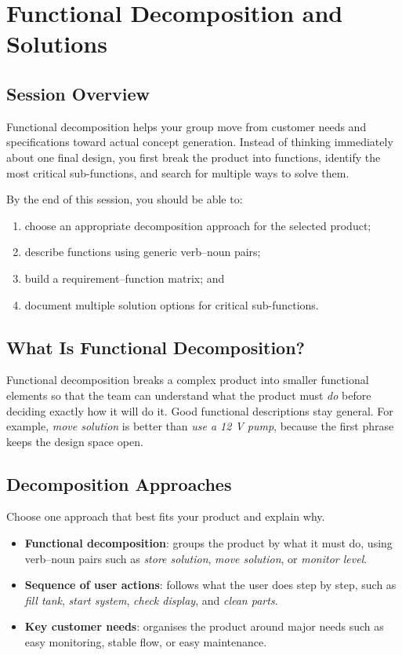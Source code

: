 \chapter{Functional Decomposition and Solutions}

\section{Session Overview}

Functional decomposition helps your group move from customer needs and specifications toward actual concept generation. Instead of thinking immediately about one final design, you first break the product into functions, identify the most critical sub-functions, and search for multiple ways to solve them.

By the end of this session, you should be able to:
\begin{enumerate}
    \item choose an appropriate decomposition approach for the selected product;
    \item describe functions using generic verb--noun pairs;
    \item build a requirement--function matrix; and
    \item document multiple solution options for critical sub-functions.
\end{enumerate}

\section{What Is Functional Decomposition?}

Functional decomposition breaks a complex product into smaller functional elements so that the team can understand what the product must \emph{do} before deciding exactly how it will do it. Good functional descriptions stay general. For example, \textit{move solution} is better than \textit{use a 12 V pump}, because the first phrase keeps the design space open.

\section{Decomposition Approaches}

Choose one approach that best fits your product and explain why.

\begin{itemize}
    \item \textbf{Functional decomposition}: groups the product by what it must do, using verb--noun pairs such as \textit{store solution}, \textit{move solution}, or \textit{monitor level}.
    \item \textbf{Sequence of user actions}: follows what the user does step by step, such as \textit{fill tank}, \textit{start system}, \textit{check display}, and \textit{clean parts}.
    \item \textbf{Key customer needs}: organises the product around major needs such as easy monitoring, stable flow, or easy maintenance.
\end{itemize}

